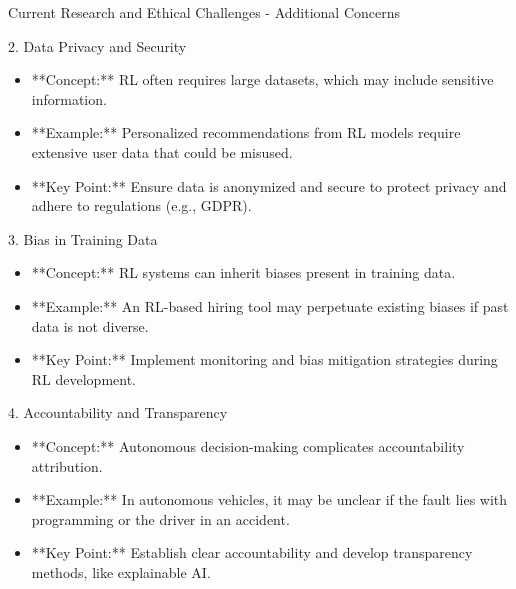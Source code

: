 \documentclass[aspectratio=169]{beamer}
\begin{document}
\begin{frame}[fragile]{Current Research and Ethical Challenges - Additional Concerns}
    \begin{block}{2. Data Privacy and Security}
        \begin{itemize}
            \item **Concept:** RL often requires large datasets, which may include sensitive information.
            \item **Example:** Personalized recommendations from RL models require extensive user data that could be misused.
            \item **Key Point:** Ensure data is anonymized and secure to protect privacy and adhere to regulations (e.g., GDPR).
        \end{itemize}
    \end{block}
    
    \begin{block}{3. Bias in Training Data}
        \begin{itemize}
            \item **Concept:** RL systems can inherit biases present in training data.
            \item **Example:** An RL-based hiring tool may perpetuate existing biases if past data is not diverse.
            \item **Key Point:** Implement monitoring and bias mitigation strategies during RL development.
        \end{itemize}
    \end{block}
    
    \begin{block}{4. Accountability and Transparency}
        \begin{itemize}
            \item **Concept:** Autonomous decision-making complicates accountability attribution.
            \item **Example:** In autonomous vehicles, it may be unclear if the fault lies with programming or the driver in an accident.
            \item **Key Point:** Establish clear accountability and develop transparency methods, like explainable AI.
        \end{itemize}
    \end{block}
\end{frame}
\end{document}
